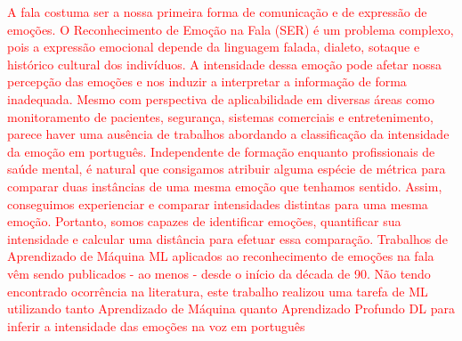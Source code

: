 \textcolor{red}{A fala costuma ser a nossa primeira forma de comunicação e de expressão de emoções. O Reconhecimento de Emoção na Fala (\acrfull{SER}) é um problema complexo, pois a expressão emocional depende da linguagem falada, dialeto, sotaque e histórico cultural dos indivíduos. A intensidade dessa emoção pode afetar nossa percepção das emoções e nos induzir a interpretar a informação de forma inadequada. Mesmo com perspectiva de aplicabilidade em diversas áreas como monitoramento de pacientes, segurança, sistemas comerciais e entretenimento, parece haver uma ausência de trabalhos abordando a classificação da intensidade da emoção em português. Independente de formação enquanto profissionais de saúde mental, é natural que consigamos atribuir alguma espécie de métrica para comparar duas instâncias de uma mesma emoção que tenhamos sentido. Assim, conseguimos experienciar e comparar intensidades distintas para uma mesma emoção. Portanto, somos capazes de identificar emoções, quantificar sua intensidade e calcular uma distância para efetuar essa comparação. Trabalhos de Aprendizado de Máquina \acrfull{ML} aplicados ao reconhecimento de emoções na fala vêm sendo publicados - ao menos - desde o início da década de 90. Não tendo encontrado ocorrência na literatura, este trabalho realizou uma tarefa de \acrshort{ML} utilizando tanto Aprendizado de Máquina quanto Aprendizado Profundo \acrfull{DL} para inferir a intensidade das emoções na voz em português}